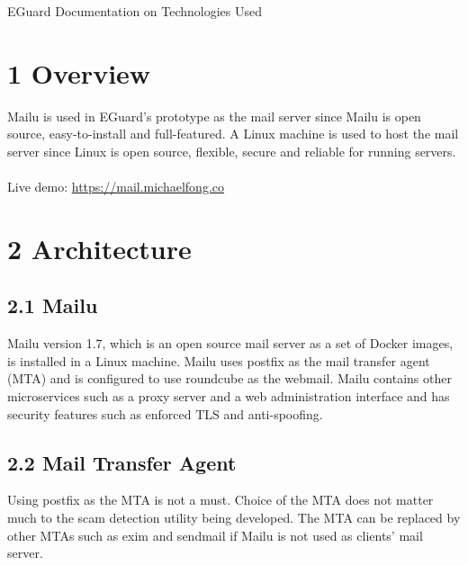 \documentclass[11pt]{article}
\begin{document}






\begin{center}
\Huge{EGuard Documentation on Technologies Used}
\end{center}

\section*{\large{1 \hspace{10pt} Overview}}
Mailu is used in EGuard's prototype as the mail server since Mailu is open source, easy-to-install and full-featured. A Linux machine is used to host the mail server since Linux is open source, flexible, secure and reliable for running servers. \\
\\
Live demo: \href{https://mail.michaelfong.co}{https://mail.michaelfong.co}

\section*{\large{2 \hspace{10pt} Architecture}}
\subsection*{2.1 \hspace{10pt} Mailu}
Mailu version 1.7, which is an open source mail server as a set of Docker images, is installed in a Linux machine. Mailu uses postfix as the mail transfer agent (MTA) and is configured to use roundcube as the webmail. Mailu contains other microservices such as a proxy server and a web administration interface and has security features such as enforced TLS and anti-spoofing.

\subsection*{2.2 \hspace{10pt} Mail Transfer Agent}
Using postfix as the MTA is not a must. Choice of the MTA does not matter much to the scam detection utility being developed. The MTA can be replaced by other MTAs such as exim and sendmail if Mailu is not used as clients' mail server. 
\end{document}
